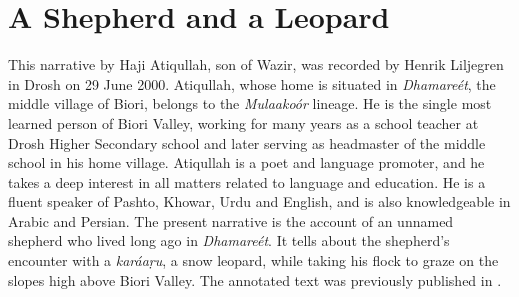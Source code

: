\appendix
{}

\section*{A Shepherd and a Leopard}

This narrative by Haji Atiqullah, son of Wazir, was recorded by Henrik Liljegren in Drosh on 29 June 2000. Atiqullah, whose home is situated in \textit{Dhamareét}, the middle village of Biori, belongs to the \textit{Mulaakoór} lineage. He is the single most learned person of Biori Valley, working for many years as a school teacher at Drosh Higher Secondary school and later serving as headmaster of the middle school in his home village. Atiqullah is a poet and language promoter, and he takes a deep interest in all matters related to language and education. He is a fluent speaker of Pashto, Khowar, Urdu and English, and is also knowledgeable in Arabic and Persian. The present narrative is the account of an unnamed shepherd who lived long ago in \textit{Dhamareét}. It tells about the shepherd’s encounter with a \textit{karáaṛu}, a snow leopard, while taking his flock to graze on the slopes high above Biori Valley. The annotated text was previously published in \citet[182--187]{liljegrenhaider2015}.

